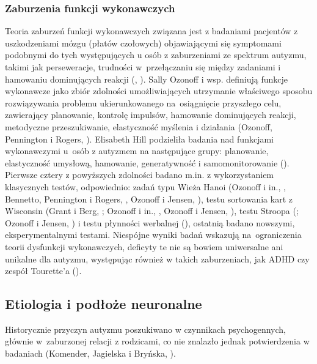     \subsubsection{Zaburzenia funkcji wykonawczych}
    Teoria zaburzeń funkcji wykonawczych związana jest z badaniami pacjentów z uszkodzeniami mózgu (płatów czołowych) objawiającymi się symptomami podobnymi do tych występujących u osób z zaburzeniami ze spektrum autyzmu, takimi jak perseweracje, trudności w~przełączaniu się między zadaniami i hamowaniu dominujących reakcji (\cite{frith2008autyzm}, \cite{russell1997autism}).
    Sally Ozonoff i wsp. definiują funkcje wykonawcze jako zbiór zdolności umożliwiających utrzymanie właściwego sposobu rozwiązywania problemu ukierunkowanego na~osiągnięcie przyszłego celu, zawierający planowanie, kontrolę impulsów, hamowanie dominujących reakcji, metodyczne przeszukiwanie, elastyczność myślenia i działania (Ozonoff, Pennington i Rogers, \cite*{ozonoff1991executive}).
    Elisabeth Hill podzieliła badania nad funkcjami wykonawczymi u~osób z autyzmem na następujące grupy: planowanie, elastyczność umysłową, hamowanie, generatywność i samomonitorowanie (\cite{hill2004evaluating}).
    Pierwsze cztery z powyższych zdolności badano m.in. z wykorzystaniem klasycznych testów, odpowiednio: zadań typu Wieża Hanoi (Ozonoff i in., \cite*{ozonoff1991executive}, Bennetto, Pennington i Rogers, \cite*{bennetto1996intact}, Ozonoff i Jensen, \cite*{ozonoff1999brief}), testu sortowania kart z Wisconsin (Grant i Berg, \cite*{grant1948behavioral}; Ozonoff i in., \cite*{ozonoff1991executive}, Ozonoff i Jensen, \cite*{ozonoff1999brief}), testu Stroopa (\cite{stroop1935studies}; Ozonoff i Jensen, \cite*{ozonoff1999brief}) i testu płynności werbalnej (\cite{turner1999generating}), ostatnią badano nowszymi, eksperymentalnymi testami. 
    Niespójne wyniki badań wskazują na~ograniczenia teorii dysfunkcji wykonawczych, deficyty te nie są bowiem uniwersalne ani unikalne dla autyzmu, występując również w takich zaburzeniach, jak ADHD czy zespół Tourette'a (\cite{hill2004evaluating}).
    
    \subsection{Etiologia i podłoże neuronalne}
    Historycznie przyczyn autyzmu poszukiwano w czynnikach psychogennych, głównie w~zaburzonej relacji z rodzicami, co nie znalazło jednak potwierdzenia w badaniach (Komender, Jagielska i Bryńska, \cite*{komender2012autyzm}). 
    
